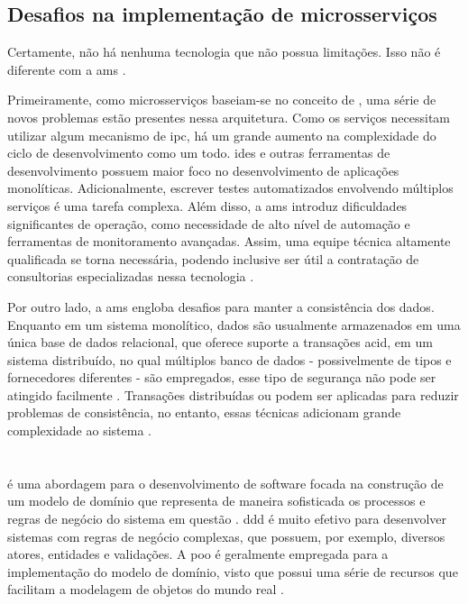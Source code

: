 \subsection{Desafios na implementação de microsserviços}
Certamente, não há nenhuma tecnologia que não possua limitações. Isso não é diferente com a \acrlong{ams} \cite{richardson2018microservices}. 

Primeiramente, como microsserviços baseiam-se no conceito de , uma série de novos problemas estão presentes nessa arquitetura. Como os serviços necessitam utilizar algum mecanismo de \acrshort{ipc}, há um grande aumento na complexidade do ciclo de desenvolvimento como um todo. \acrshort{ide}s e outras ferramentas de desenvolvimento possuem maior foco no desenvolvimento de aplicações monolíticas. Adicionalmente, escrever testes automatizados envolvendo múltiplos serviços é uma tarefa complexa. Além disso, a \acrshort{ams} introduz dificuldades significantes de operação, como necessidade de alto nível de automação e ferramentas de monitoramento avançadas. Assim, uma equipe técnica altamente qualificada se torna necessária, podendo inclusive ser útil a contratação de consultorias especializadas nessa tecnologia \cite{richardson2018microservices}.

Por outro lado, a \acrfull{ams} engloba desafios para manter a consistência dos dados. Enquanto em um sistema monolítico, dados são usualmente armazenados em uma única base de dados relacional, que oferece suporte a transações \acrshort{acid}, em um sistema distribuído, no qual múltiplos banco de dados - possivelmente de tipos e fornecedores diferentes - são empregados, esse tipo de segurança não pode ser atingido facilmente \cite{buildingMicroservices}. Transações distribuídas ou  podem ser aplicadas para reduzir problemas de consistência, no entanto, essas técnicas adicionam grande complexidade ao sistema \cite{buildingMicroservices}.

\section{} 
 é uma abordagem para o desenvolvimento de software focada na construção de um modelo de domínio que representa de maneira sofisticada os processos e regras de negócio do sistema em questão \cite{dddFowler}. \acrshort{ddd} é muito efetivo para desenvolver sistemas com regras de negócio complexas, que possuem, por exemplo, diversos atores, entidades e validações. A \acrfull{poo} é geralmente empregada para a implementação do modelo de domínio, visto que possui uma série de recursos que facilitam a modelagem de objetos do mundo real \cite{evans2004ddd}.

